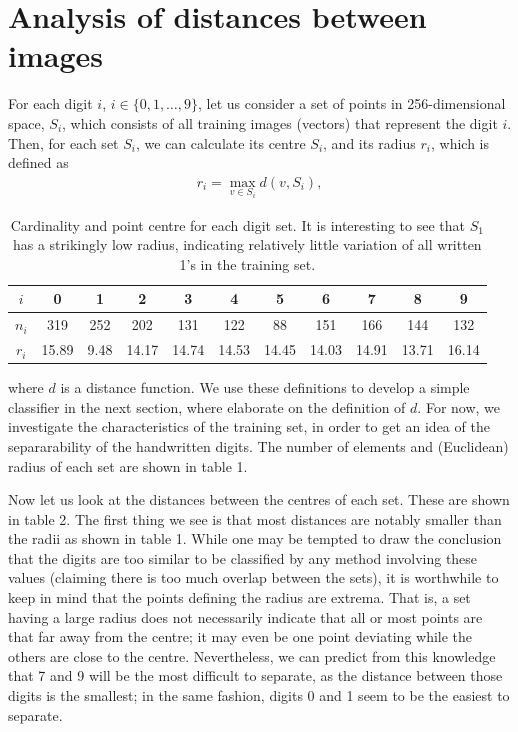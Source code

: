 \documentclass[11pt]{article}
\begin{document}
\section{Analysis of distances between images}
For each digit $i$, $i\in\{0, 1, \ldots, 9\}$, let us consider a set of points in 256-dimensional space, $S_i$, which consists of all training images (vectors) that represent the digit $i$. Then, for each set $S_i$, we can calculate its centre $S_i$, and its radius $r_i$, which is defined as
\begin{align}
r_i=\max_{v\in S_i}d(v, S_i),
\end{align}
\begin{table}
\centering
\small
\begin{tabular}{c|cccccccccc}
$i$&0&1&2&3&4&5&6&7&8&9\\\hline
$n_i$&319&252&202&131&122&88&151&166&144&132\\
$r_i$&15.89&9.48&14.17&14.74&14.53&14.45&14.03&14.91&13.71&16.14
\end{tabular}
\caption{Cardinality and point centre for each digit set. It is interesting to see that $S_1$ has a strikingly low radius, indicating relatively little variation of all written 1's in the training set.}
\normalsize
\end{table}
where $d$ is a distance function. We use these definitions to develop a simple classifier in the next section, where elaborate on the definition of $d$. For now, we investigate the characteristics of the training set, in order to get an idea of the separarability of the handwritten digits. The number of elements and (Euclidean) radius of each set are shown in table 1.\par
Now let us look at the distances between the centres of each set. These are shown in table 2. The first thing we see is that most distances are notably smaller than the radii as shown in table 1. While one may be tempted to draw the conclusion that the digits are too similar to be classified by any method involving these values (claiming there is too much overlap between the sets), it is worthwhile to keep in mind that the points defining the radius are extrema. That is, a set having a large radius does not necessarily indicate that all or most points are that far away from the centre; it may even be one point deviating while the others are close to the centre. Nevertheless, we can predict from this knowledge that 7 and 9 will be the most difficult to separate, as the distance between those digits is the smallest; in the same fashion, digits 0 and 1 seem to be the easiest to separate.
\end{document}
